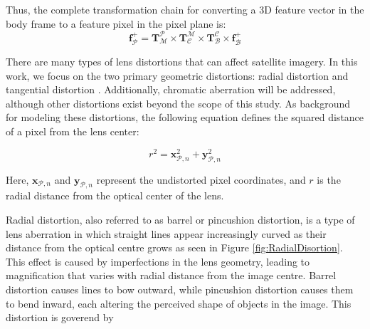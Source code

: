 \noindent
Thus, the complete transformation chain for converting a 3D feature vector in the body frame to a feature pixel in the pixel plane is:
\begin{equation}
    \mathbf{f}_\mathcal{P}^+ = 
    \mathbf{T}_\mathcal{M}^\mathcal{P} \times
    \mathbf{T}_\mathcal{C}^\mathcal{M} \times  
    \mathbf{T}_\mathcal{B}^\mathcal{C} \times 
    \mathbf{f}_\mathcal{B}^+
\end{equation}



\noindent
There are many types of lens distortions that can affect satellite imagery. In this work, we focus on the two primary geometric distortions: radial distortion and tangential distortion \cite{Wang}. 
Additionally, chromatic aberration will be addressed, although other distortions exist beyond the scope of this study. 
As background for modeling these distortions, the following equation defines the squared distance of a pixel from the lens center:

\begin{equation}
    r^2 = \mathbf{x}_{\mathcal{P},n}^2 + \mathbf{y}_{\mathcal{P},n}^2
    \label{eq:radialDistance}
\end{equation}

\noindent
Here, $\mathbf{x}_{\mathcal{P},n}$ and $\mathbf{y}_{\mathcal{P},n}$ represent the undistorted pixel coordinates, and $r$ is the radial distance from the optical center of the lens.


Radial distortion, also referred to as barrel or pincushion distortion, is a type of lens aberration in which straight lines appear increasingly curved as their 
distance from the optical centre grows as seen in Figure \ref{fig:RadialDisortion}. This effect is caused by imperfections in the lens geometry, leading to magnification that varies with radial distance 
from the image centre. Barrel distortion causes lines to bow outward, while pincushion distortion causes them to bend inward, each altering the perceived 
shape of objects in the image. This distortion is goverend by

